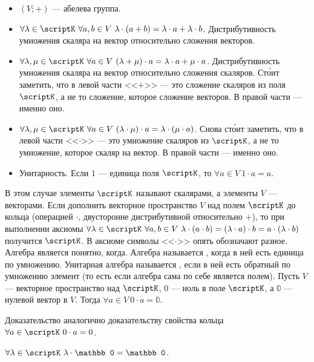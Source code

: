 \documentclass{article}
\begin{document}
\begin{itemize}
\begin{itemize}
            \item $(V;+)$ --- абелева группа.
            \item $\forall\lambda\in\scriptK~\forall a,b\in V~\lambda\cdot(a+b)=\lambda\cdot a+\lambda\cdot b$. Дистрибутивность умножения скаляра на вектор относительно сложения векторов.
            \item $\forall\lambda,\mu\in\scriptK~\forall a\in V~(\lambda+\mu)\cdot a=\lambda\cdot a+\mu\cdot a$. Дистрибутивность умножения скаляра на вектор относительно сложения скаляров. Ст\'{о}ит заметить, что в левой части <<$+$>> --- это сложение скаляров из поля $\scriptK$, а не то сложение, которое сложение векторов. В правой части --- именно оно.
            \item $\forall\lambda,\mu\in\scriptK~\forall a\in V~(\lambda\cdot\mu)\cdot a=\lambda\cdot(\mu\cdot a)$. Снова ст\'{о}ит заметить, что в левой части <<$\cdot$>> --- это умножение скаляров из $\scriptK$, а не то умножение, которое скаляр на вектор. В правой части --- именно оно.
            \item Унитарность. Если $1$ --- единица поля $\scriptK$, то $\forall a\in V~1\cdot a=a$.
        \end{itemize}
        В этом случае элементы $\scriptK$ называют скалярами, а элементы $V$ --- векторами.
        \dfn Если дополнить векторное пространство $V$ над полем $\scriptK$ до кольца (операцией $\cdot$, двусторонне дистрибутивной относительно $+$), то при выполнении аксиомы $\forall\lambda\in\scriptK~\forall a,b\in V~\lambda\cdot(a\cdot b)=(\lambda\cdot a)\cdot b=a\cdot(\lambda\cdot b)$ получится  $\scriptK$. В аксиоме символы <<$\cdot$>> опять обозначают разное.
        \dfn Алгебра является  понятно, когда.
        \dfn Алгебра называется , когда в ней есть единица по умножению.
        \dfn Унитарная алгебра называется , если в ней есть обратный по умножению элемент (то есть если алгебра сама по себе является полем).
        \thm Пусть $V$ --- векторное пространство над $\scriptK$, $0$ --- ноль в поле $\scriptK$, а $\mathbb0$ --- нулевой вектор в $V$. Тогда $\forall a\in V~0\cdot a=\mathbb0$.
        \begin{Proof}
            Доказательство аналогично доказательству свойства кольца $\forall a\in\scriptK~0\cdot a=0$.
        \end{Proof}
        \thm $\forall\lambda\in\scriptK~\lambda\cdot\mathbb0=\mathbb0$.
        \begin{Proof}

\end{Proof}
\end{itemize}
\end{document}
